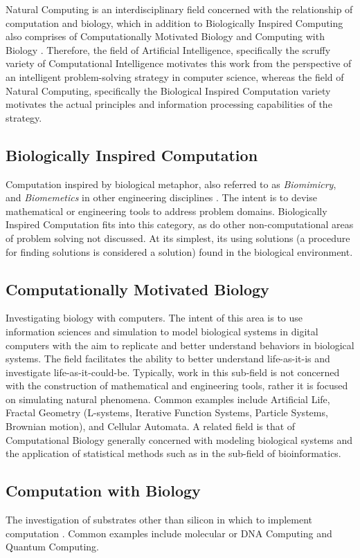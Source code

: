 \documentclass[a4paper, 11pt]{article}
\begin{document}
Natural Computing is an interdisciplinary field concerned with the relationship of computation and biology, which in addition to Biologically Inspired Computing also comprises of Computationally Motivated Biology and Computing with Biology \cite{Paun2005, Marrow2000}. Therefore, the field of Artificial Intelligence, specifically the scruffy variety of Computational Intelligence motivates this work from the perspective of an intelligent problem-solving strategy in computer science, whereas the field of Natural Computing, specifically the Biological Inspired Computation variety motivates the actual principles and information processing capabilities of the strategy.

\subsection{Biologically Inspired Computation}
Computation inspired by biological metaphor, also referred to as \emph{Biomimicry}, and \emph{Biomemetics} in other engineering disciplines \cite{Castro2005, Benyus1998}. The intent is to devise mathematical or engineering tools to address problem domains. Biologically Inspired Computation fits into this category, as do other non-computational areas of problem solving not discussed. At its simplest, its using solutions (a procedure for finding solutions is considered a solution) found in the biological environment.

\subsection{Computationally Motivated Biology}
Investigating biology with computers. The intent of this area is to use information sciences and simulation to model biological systems in digital computers with the aim to replicate and better understand behaviors in biological systems. The field facilitates the ability to better understand life-as-it-is and investigate life-as-it-could-be. Typically, work in this sub-field is not concerned with the construction of mathematical and engineering tools, rather it is focused on simulating natural phenomena. Common examples include Artificial Life, Fractal Geometry (L-systems, Iterative Function Systems, Particle Systems, Brownian motion), and Cellular Automata. A related field is that of Computational Biology generally concerned with modeling biological systems and the application of statistical methods such as in the sub-field of bioinformatics.

\subsection{Computation with Biology}
The investigation of substrates other than silicon in which to implement computation \cite{Aaronson2005}. Common examples include molecular or DNA Computing and Quantum Computing.
\end{document}
